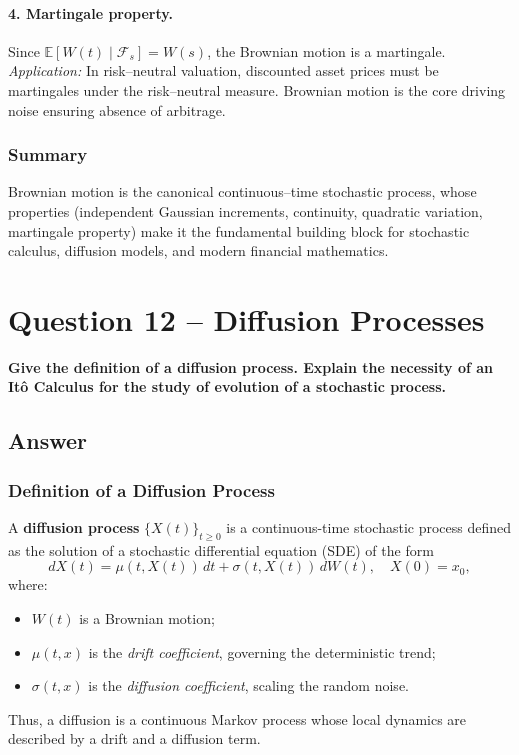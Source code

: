 \documentclass[12pt,a4paper]{book}
\theoremstyle{remark}
\newcommand{\EE}{\mathbb{E}}          %
\newcommand{\F}{\mathcal{F}}          %
\begin{document}
\paragraph{4. Martingale property.}
Since $\EE[W(t)\mid\F_s]=W(s)$, the Brownian motion is a martingale.  
\emph{Application:} In risk–neutral valuation, discounted asset prices must be martingales under the risk–neutral measure. Brownian motion is the core driving noise ensuring absence of arbitrage.

\subsubsection*{Summary}
Brownian motion is the canonical continuous–time stochastic process, whose properties (independent Gaussian increments, continuity, quadratic variation, martingale property) make it the fundamental building block for stochastic calculus, diffusion models, and modern financial mathematics.




\newpage
\section{Question 12 -- Diffusion Processes}
\textbf{Give the definition of a diffusion process. Explain the necessity of an Itô Calculus for the study of evolution of a stochastic process.}

\subsection*{Answer}

\subsubsection*{Definition of a Diffusion Process}
A \textbf{diffusion process} $\{X(t)\}_{t\ge 0}$ is a continuous-time stochastic process defined as the solution of a stochastic differential equation (SDE) of the form
\[
dX(t) = \mu(t,X(t))\,dt + \sigma(t,X(t))\,dW(t), \quad X(0)=x_0,
\]
where:
\begin{itemize}
    \item $W(t)$ is a Brownian motion;
    \item $\mu(t,x)$ is the \emph{drift coefficient}, governing the deterministic trend;
    \item $\sigma(t,x)$ is the \emph{diffusion coefficient}, scaling the random noise.
\end{itemize}
Thus, a diffusion is a continuous Markov process whose local dynamics are described by a drift and a diffusion term.
\end{document}
